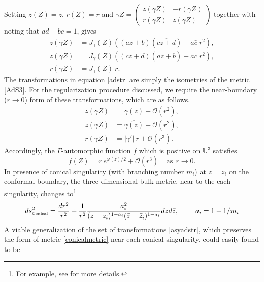 \documentclass[a4paper,11pt]{article}
\begin{document}
Setting $z(Z)= z$, $r(Z)=r$ and $\gamma Z= \begin{pmatrix}
z(\gamma Z) & -r(\gamma Z) \\
r(\gamma Z) & \bar{z}(\gamma Z)
\end{pmatrix}$ together with noting that $ad -bc=1$, gives
\begin{equation}
\begin{aligned}
z(\gamma Z) &= J_{\gamma}(Z)\left((a z +b)(\overline{c z +d})+ a \bar{c}~r^2\right),\\\bar{z}(\gamma Z) &= J_{\gamma}(Z) \left((c z + d)(\overline{a z +b})+ \bar{a} c~r^2\right),\\
r(\gamma Z) &= J_{\gamma}(Z)~r.
\end{aligned}\label{adstr}
\end{equation}
The transformations in equation \eqref{adstr} are simply the isometries of the metric \eqref{AdS3}. For the regularization procedure discussed, we require the near-boundary ($r\rightarrow 0$) form of these transformations, which are as follows.
\begin{equation}
\begin{aligned}
z(\gamma Z) &= \gamma(z)+\mathcal{O}(r^2),\\\bar{z}(\gamma Z) &= \overline{\gamma(z)}+\mathcal{O}(r^2),\\
r(\gamma Z) &= |\gamma'|~r+ \mathcal{O}(r^3).
\end{aligned}\label{asyadstr}
\end{equation}
Accordingly, the $\Gamma$-automorphic function $f$ which is positive on $\mathbb{U}^3$ satisfies
\begin{equation}
f(Z)= r~e^{\varphi(z)/2} +\mathcal{O}(r^3)~~~~~ \text{as} ~~r\rightarrow 0.\label{fcompact}
\end{equation}
In presence of conical singularity (with branching number $m_i$) at $z=z_i$ on the conformal boundary, the three dimensional bulk metric, near to the each singularity, changes to\footnote{For example, see \cite{Krasnov_2001} for more details.}
\begin{equation}
	\begin{aligned}
		ds^2_{\text{\tiny Conical}} = \frac{dr^2}{r^2} + \frac{1}{r^2} \frac{a_i^2}{(z-z_i)^{1-a_i}(\bar{z} - \bar{z}_i)^{1-a_i}}dzd\bar{z}, ~~~~~~~a_i=1-1/m_i
	\end{aligned}
	\label{conicalmetric}
\end{equation}
A viable generalization of the set of transformations \eqref{asyadstr}, which preserves the form of metric \eqref{conicalmetric} near each conical singularity, could easily  found to be
\end{document}
